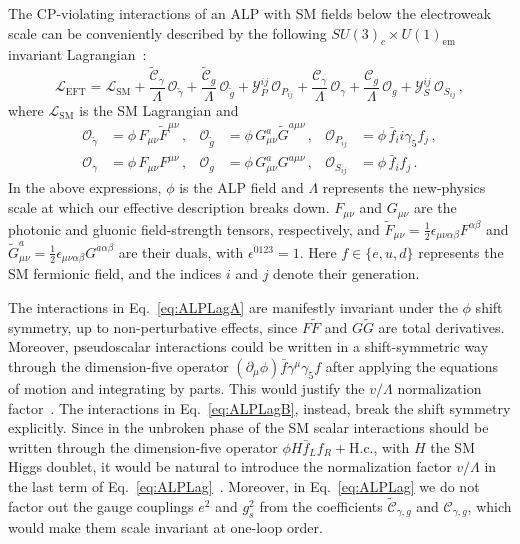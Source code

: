 The CP-violating interactions of an ALP with SM fields below the
electroweak scale can be conveniently described by the following
$SU(3)_c \times U(1)_{\text{em}}$ invariant Lagrangian~\cite{Marciano:2016yhf,DiLuzio:2020oah}:
\begin{equation}
\label{eq:ALPLag}
\mathcal{L}_{\text{EFT}} = \mathcal{L}_{\text{SM}} +
\frac{\widetilde{\mathcal C}_\gamma}{\Lambda}\, \mathcal{O}_{\tilde\gamma}
+ \frac{\widetilde{\mathcal C}_g}{\Lambda}\, \mathcal{O}_{\tilde g}
+ \mathcal{Y}^{ij}_P\, \mathcal{O}_{P_{ij}}
+\frac{\mathcal C_\gamma}{\Lambda}\, \mathcal{O}_\gamma
+ \frac{\mathcal C_g}{\Lambda}\, \mathcal{O}_g
+ \mathcal{Y}^{ij}_S\, \mathcal{O}_{S_{ij}}\,,
\end{equation}
where $\mathcal{L}_{\text{SM}}$ is the SM Lagrangian and
\begin{align}
\label{eq:ALPLagA}
     \mathcal{O}_{\tilde \gamma} &= \phi\, F_{\mu\nu}\widetilde F^{\mu\nu}\,,
     & \mathcal{O}_{\tilde g} &= \phi\, G_{\mu\nu}^a\widetilde G^{a\mu\nu}\,,
     & \mathcal O_{P_{ij}} &= \phi\, \bar{f}_i i \gamma_5 f_j\,,
     \\
\label{eq:ALPLagB}
 \mathcal O_\gamma &= \phi\, F_{\mu\nu}F^{\mu\nu}\,,
 & \mathcal O_g &= \phi\, G_{\mu\nu}^aG^{a\mu\nu}\,,
 & \mathcal O_{S_{ij}} &= \phi\, \bar{f}_i f_j\,.
\end{align}
In the above expressions, $\phi$ is the ALP field and $\Lambda$ represents the new-physics
scale at which our effective description breaks down.
$F_{\mu\nu}$ and $G_{\mu\nu}$ are the photonic and gluonic field-strength tensors,
respectively, and
$\widetilde{F}_{\mu\nu} = \frac{1}{2} \epsilon_{\mu\nu\alpha\beta}F^{\alpha \beta}$ and
$\widetilde{G}^a_{\mu\nu} = \frac{1}{2} \epsilon_{\mu\nu\alpha\beta}G^{a \alpha \beta}$ are their
duals, with $\epsilon^{0123}=1$.
Here $f \in \{ e, u, d \}$ represents the SM fermionic field, and the indices $i$ and $j$ denote
their generation.

The interactions in Eq.~\eqref{eq:ALPLagA} are manifestly invariant under the $\phi$ shift
symmetry, up to non-perturbative effects, since $F\widetilde{F}$ and $G\widetilde{G}$ are total
derivatives.
Moreover, pseudoscalar interactions could be written in a shift-symmetric way through the
dimension-five operator $(\partial_\mu \phi)\bar f \gamma^\mu\gamma_5 f$
after applying the equations of motion and integrating by parts.
This would justify the $v/\Lambda$ normalization factor~\cite{DiLuzio:2020wdo}.
The interactions in Eq.~\eqref{eq:ALPLagB}, instead, break the shift symmetry explicitly.
Since in the unbroken phase of the SM scalar interactions should be written through the
dimension-five operator $\phi H \bar f_L f_R + \text{H.c.}$, with $H$ the SM Higgs doublet,
it would be natural to introduce the normalization factor $v/\Lambda$ in the last term of
Eq.~\eqref{eq:ALPLag}~\cite{DiLuzio:2020wdo}.
Moreover, in Eq.~\eqref{eq:ALPLag} we do not factor out the gauge couplings $e^2$ and $g^2_s$
from the coefficients $\widetilde{\mathcal C}_{\gamma,g}$ and $\mathcal C_{\gamma,g}$, which
would make them scale invariant at one-loop order.

